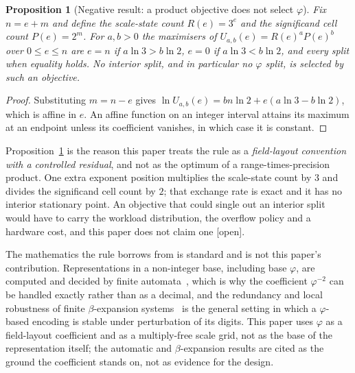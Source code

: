 \documentclass[11pt]{article}
\newtheorem{proposition}[theorem]{Proposition}
\theoremstyle{definition}
\begin{document}
\begin{proposition}[Negative result: a product objective does not select
$\varphi$]
\label{prop:phi-product-negative}
Fix $n=e+m$ and define the scale-state count $R(e)=3^{e}$ and the significand
cell count $P(e)=2^{m}$. For $a,b>0$ the maximisers of
$U_{a,b}(e)=R(e)^{a}P(e)^{b}$ over $0\leq e\leq n$ are $e=n$ if
$a\ln3>b\ln2$, $e=0$ if $a\ln3<b\ln2$, and every split when equality holds. No
interior split, and in particular no $\varphi$ split, is selected by such an
objective.
\end{proposition}
\begin{proof}
Substituting $m=n-e$ gives
$\ln U_{a,b}(e)=bn\ln2+e(a\ln3-b\ln2)$, which is affine in $e$. An affine
function on an integer interval attains its maximum at an endpoint unless its
coefficient vanishes, in which case it is constant.
\end{proof}

Proposition~\ref{prop:phi-product-negative} is the reason this paper treats the
rule as a \emph{field-layout convention with a controlled residual}, and not as
the optimum of a range-times-precision product. One extra exponent position
multiplies the scale-state count by $3$ and divides the significand cell count by
$2$; that exchange rate is exact and it has no interior stationary point. An
objective that could single out an interior split would have to carry the
workload distribution, the overflow policy and a hardware cost, and this paper
does not claim one [open].

The mathematics the rule borrows from is standard and is not this paper's
contribution. Representations in a non-integer base, including base $\varphi$, are
computed and decided by finite automata~\cite{barnoff2024}, which is why the
coefficient $\varphi^{-2}$ can be handled exactly rather than as a decimal, and
the redundancy and local robustness of finite $\beta$-expansion
systems~\cite{betaexp2026} is the general setting in which a $\varphi$-based
encoding is stable under perturbation of its digits. This paper uses $\varphi$ as
a field-layout coefficient and as a multiply-free scale grid, not as the base of
the representation itself; the automatic and $\beta$-expansion results are cited
as the ground the coefficient stands on, not as evidence for the design.
\end{document}
